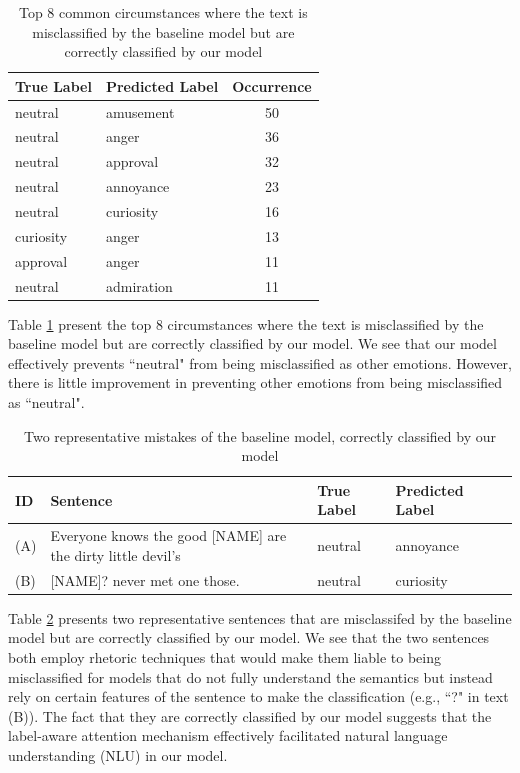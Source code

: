 \begin{table}[h!]
\centering
\begin{tabular}{l  l  c }
\hline\hline
True Label& Predicted Label & Occurrence  \\ [0.5ex]
\hline 
neutral  & amusement  & 50\\
neutral  & anger  & 36\\
neutral  & approval  & 32\\
neutral  & annoyance  & 23\\
neutral  & curiosity  & 16\\
curiosity   & anger  & 13\\
approval  &  anger  & 11\\
neutral &  admiration  & 11\\[1ex]
\hline 
\end{tabular}
\vspace{1ex}
\caption{Top 8 common circumstances where the text is misclassified by the baseline model but are correctly classified by our model}
\label{table:imp} 
\end{table}

Table \ref{table:imp} present the top 8 circumstances where the text is misclassified by the baseline model but are correctly classified by our model. We see that our model effectively prevents ``neutral" from being misclassified as other emotions. However, there is little improvement in preventing other emotions from being misclassified as ``neutral". 

\begin{table}[h!]
\centering
\begin{tabular}{l  l  l l l} \hline \hline 
ID &Sentence & True Label& Predicted Label  \\ [0.5ex]
\hline
(A)& Everyone knows the good [NAME] are the dirty little devil's & neutral  & annoyance\\[1ex]
(B) &[NAME]? never met one those. & neutral  & curiosity\\[1ex]
\hline 
\end{tabular}
\vspace{1ex}
\caption{Two representative mistakes of the baseline model, correctly classified by our model}
\label{table:exp} 
\end{table}

Table \ref{table:exp} presents two representative sentences that are misclassifed by the baseline model but are correctly classified by our model. We see that the two sentences both employ rhetoric techniques that would make them liable to being misclassified for models that do not fully understand the semantics but instead rely on certain features of the sentence to make the classification (e.g., ``?" in text (B)). The fact that they are correctly classified by our model suggests that the label-aware attention mechanism effectively facilitated natural language understanding (NLU) in our model. 


